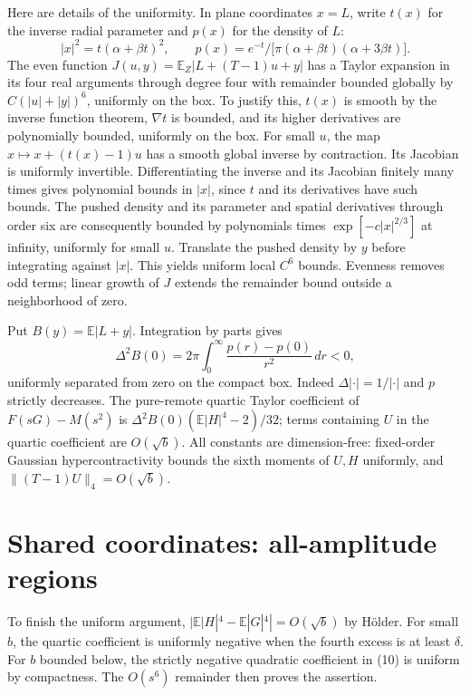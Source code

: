 \documentclass[11pt]{article}
\newcommand{\E}{\mathbb E}
\newcommand{\dd}{\,d}
\newcommand{\head}[1]{\section*{#1}}
\begin{document}
Here are details of the uniformity. In plane coordinates \(x=L\), write \(t(x)\)
for the inverse radial parameter and \(p(x)\) for the density of \(L\):
\[
 |x|^2=t(\alpha+\beta t)^2,\qquad
 p(x)=e^{-t}/\bigl[\pi(\alpha+\beta t)(\alpha+3\beta t)\bigr].
\]
The even function \(J(u,y)=\E_Z|L+(T-1)u+y|\) has a Taylor expansion in its four
real arguments through degree four with remainder bounded globally by
\(C(|u|+|y|)^6\), uniformly on the box. To justify this, \(t(x)\) is smooth by
the inverse function theorem, \(\nabla t\) is bounded, and its higher derivatives
are polynomially bounded, uniformly on the box. For small \(u\), the map
\(x\mapsto x+(t(x)-1)u\) has a smooth global inverse by contraction. Its Jacobian
is uniformly invertible. Differentiating the inverse and its Jacobian finitely
many times gives polynomial bounds in \(|x|\), since \(t\) and its derivatives
have such bounds. The pushed density and its parameter and spatial derivatives
through order six are consequently bounded by polynomials times
\(\exp[-c|x|^{2/3}]\) at infinity, uniformly for small \(u\). Translate the
pushed density by \(y\) before integrating against \(|x|\). This yields uniform
local \(C^6\) bounds. Evenness removes odd terms; linear growth of \(J\)
extends the remainder bound outside a neighborhood of zero.

Put \(B(y)=\E|L+y|\). Integration by parts gives
\[
 \Delta^2 B(0)=2\pi\int_0^\infty \frac{p(r)-p(0)}{r^2}\dd r<0 ,
\]
uniformly separated from zero on the compact box. Indeed \(\Delta|\cdot|=1/|\cdot|\)
and \(p\) strictly decreases. The pure-remote quartic Taylor coefficient of
\(F(sG)-M(s^2)\) is \(\Delta^2 B(0)(\E|H|^4-2)/32\); terms containing \(U\) in
the quartic coefficient are \(O(\sqrt b)\). All constants are dimension-free:
fixed-order Gaussian hypercontractivity bounds the sixth moments of \(U,H\)
uniformly, and \(\|(T-1)U\|_4=O(\sqrt b)\).

\newpage
\head{Shared coordinates: all-amplitude regions}
To finish the uniform argument, \(|\E|H|^4-\E|G|^4|=O(\sqrt b)\) by Hölder.
For small \(b\), the quartic coefficient is uniformly negative when the fourth
excess is at least \(\delta\). For \(b\) bounded below, the strictly negative
quadratic coefficient in (10) is uniform by compactness. The \(O(s^6)\) remainder
then proves the assertion.
\end{document}
